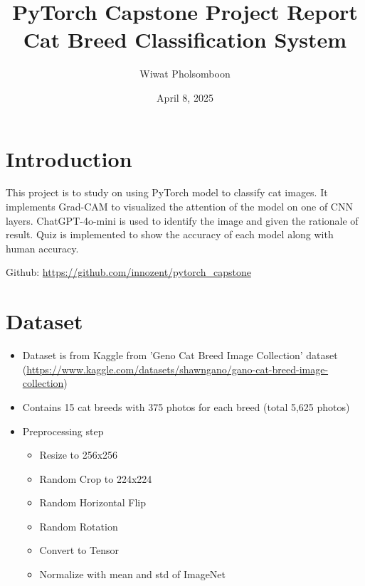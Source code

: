 \documentclass{article}
\title{\textcolor{maincolor}{\Huge PyTorch Capstone Project Report}\\
\textcolor{secondcolor}{\Large Cat Breed Classification System}}
\author{\textcolor{secondcolor}{Wiwat Pholsomboon}}
\date{\textcolor{secondcolor}{April 8, 2025}}
\begin{document}
\maketitle

\section{Introduction}
This project is to study on using PyTorch model to classify cat images. It implements Grad-CAM to visualized the attention of the model on one of CNN layers. ChatGPT-4o-mini is used to identify the image and given the rationale of result. Quiz is implemented to show the accuracy of each model along with human accuracy.

Github: \href{https://github.com/innozent/pytorch_capstone}{https://github.com/innozent/pytorch\_capstone}

\section{Dataset}
\begin{itemize}
    \item Dataset is from Kaggle from 'Geno Cat Breed Image Collection' dataset (\url{https://www.kaggle.com/datasets/shawngano/gano-cat-breed-image-collection})
    \item Contains 15 cat breeds with 375 photos for each breed (total 5,625 photos)
    \item Preprocessing step
    \begin{itemize}
        \item Resize to 256x256
        \item Random Crop to 224x224
        \item Random Horizontal Flip
        \item Random Rotation
        \item Convert to Tensor
        \item Normalize with mean and std of ImageNet
    \end{itemize}
\end{itemize}
\end{document}
